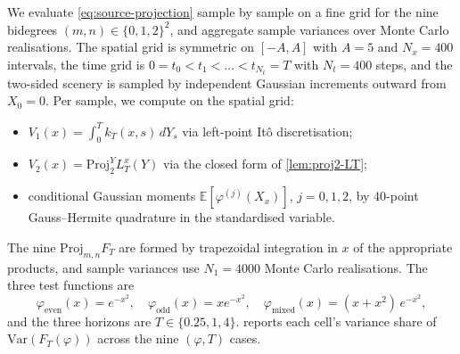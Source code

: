 \documentclass[11pt,reqno]{amsart}
\theoremstyle{plain}
\theoremstyle{definition}
\theoremstyle{remark}
\newcommand{\E}{\mathbb{E}}
\newcommand{\Var}{\mathrm{Var}}
\newcommand{\Proj}{\mathrm{Proj}}
\newcommand{\Loc}{L}
\begin{document}
We evaluate \eqref{eq:source-projection} sample by sample on a fine
grid for the nine bidegrees $(m, n) \in \{0, 1, 2\}^2$, and aggregate
sample variances over Monte Carlo realisations. The spatial grid is
symmetric on $[-A, A]$ with $A = 5$ and $N_x = 400$ intervals, the
time grid is $0 = t_0 < t_1 < \dots < t_{N_t} = T$ with $N_t = 400$
steps, and the two-sided scenery is sampled by independent Gaussian
increments outward from $X_0 = 0$. Per sample, we compute on the
spatial grid:
\begin{itemize}
  \item $V_1(x) = \int_0^T k_T(x, s)\,dY_s$ via left-point It\^o
    discretisation;
  \item $V_2(x) = \Proj^Y_2 \Loc_T^x(Y)$ via the closed form of
    \cref{lem:proj2-LT};
  \item conditional Gaussian moments $\E[\varphi^{(j)}(X_x)]$,
    $j = 0, 1, 2$, by 40-point Gauss--Hermite quadrature in the
    standardised variable.
\end{itemize}
The nine $\Proj_{m,n} F_T$ are formed by trapezoidal integration in
$x$ of the appropriate products, and sample variances use
$N_1 = 4000$ Monte Carlo realisations. The three test functions are
\[
  \varphi_{\mathrm{even}}(x) = e^{-x^2},\quad
  \varphi_{\mathrm{odd}}(x) = x e^{-x^2},\quad
  \varphi_{\mathrm{mixed}}(x) = (x + x^2)\,e^{-x^2},
\]
and the three horizons are $T \in \{0.25, 1, 4\}$.
 reports each cell's variance share of
$\Var(F_T(\varphi))$ across the nine $(\varphi, T)$ cases.
\end{document}
